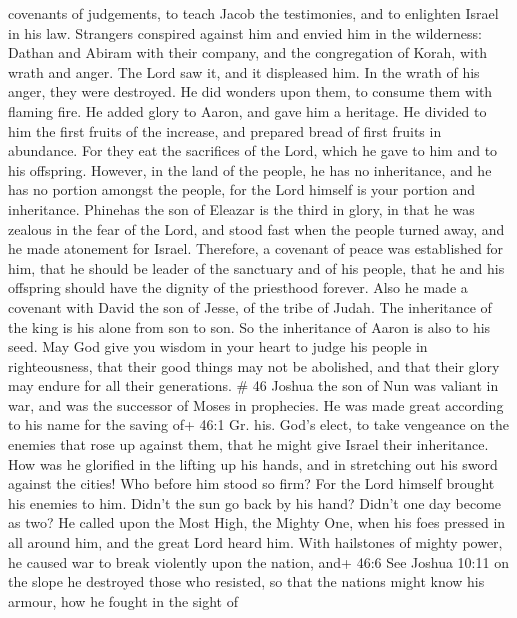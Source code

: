 covenants of judgements, to teach Jacob the testimonies, and to
enlighten Israel in his law.  Strangers conspired against
him and envied him in the wilderness: Dathan and Abiram with their
company, and the congregation of Korah, with wrath and anger.
 The Lord saw it, and it displeased him. In the wrath of
his anger, they were destroyed. He did wonders upon them, to consume
them with flaming fire.  He added glory to Aaron, and gave
him a heritage. He divided to him the first fruits of the increase, and
prepared bread of first fruits in abundance.  For they eat
the sacrifices of the Lord, which he gave to him and to his offspring.
 However, in the land of the people, he has no inheritance,
and he has no portion amongst the people, for the Lord himself is your
portion and inheritance.  Phinehas the son of Eleazar is
the third in glory, in that he was zealous in the fear of the Lord, and
stood fast when the people turned away, and he made atonement for
Israel.  Therefore, a covenant of peace was established for
him, that he should be leader of the sanctuary and of his people, that
he and his offspring should have the dignity of the priesthood forever.
 Also he made a covenant with David the son of Jesse, of
the tribe of Judah. The inheritance of the king is his alone from son to
son. So the inheritance of Aaron is also to his seed.  May
God give you wisdom in your heart to judge his people in righteousness,
that their good things may not be abolished, and that their glory may
endure for all their generations. \# 46  Joshua the son of
Nun was valiant in war, and was the successor of Moses in prophecies. He
was made great according to his name for the saving of+ 46:1 Gr. his.
God's elect, to take vengeance on the enemies that rose up against them,
that he might give Israel their inheritance.  How was he
glorified in the lifting up his hands, and in stretching out his sword
against the cities!  Who before him stood so firm? For the
Lord himself brought his enemies to him.  Didn't the sun go
back by his hand? Didn't one day become as two?  He called
upon the Most High, the Mighty One, when his foes pressed in all around
him, and the great Lord heard him.  With hailstones of
mighty power, he caused war to break violently upon the nation, and+
46:6 See Joshua 10:11 on the slope he destroyed those who resisted, so
that the nations might know his armour, how he fought in the sight of
